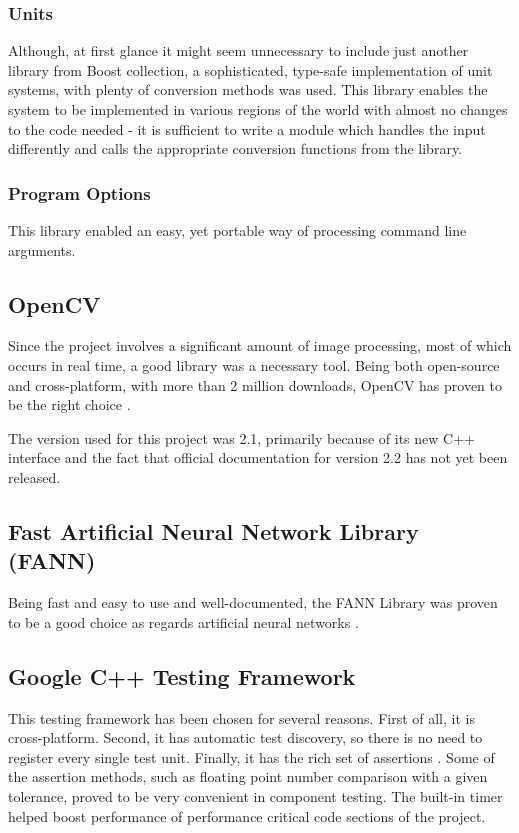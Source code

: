 \documentclass[times, utf8, zavrsni]{fer}
\begin{document}
\subsubsection{Units}
Although, at first glance it might seem unnecessary to include just another
library from Boost collection, a sophisticated, type-safe implementation of unit
systems, with plenty of conversion methods was used. This library enables the
system to be implemented in various regions of the world with almost no changes
to the code needed - it is sufficient to write a module which handles the input
differently and calls the appropriate conversion functions from the library.

\subsubsection{Program Options}
This library enabled an easy, yet portable way of processing command line
arguments.

\subsection{OpenCV}
Since the project involves a significant amount of image processing, most of
which occurs in real time, a good library was a necessary tool. Being both
open-source and cross-platform, with more than 2 million downloads, OpenCV has
proven to be the right choice \citep{opencv-wiki:main}.

The version used for this project was 2.1, primarily because of its new C++
interface and the fact that official documentation for version 2.2 has not yet
been released.

\subsection{Fast Artificial Neural Network Library (FANN)}
Being fast and easy to use and well-documented, the
FANN Library was proven to be a good choice as
regards artificial neural networks \citep{fann:sf-summary}. 

\subsection{Google C++ Testing Framework}

This testing framework has been chosen for several reasons. First of all, it is
cross-platform. Second, it has automatic test discovery, so there is no need to
register every single test unit. Finally, it has the rich set of assertions
\citep{gtest:gcode-summary}. Some of the assertion methods, such as floating
point number comparison with a given tolerance, proved to be very convenient in
component testing. The built-in timer helped boost performance of performance
critical code sections of the project.
\end{document}
